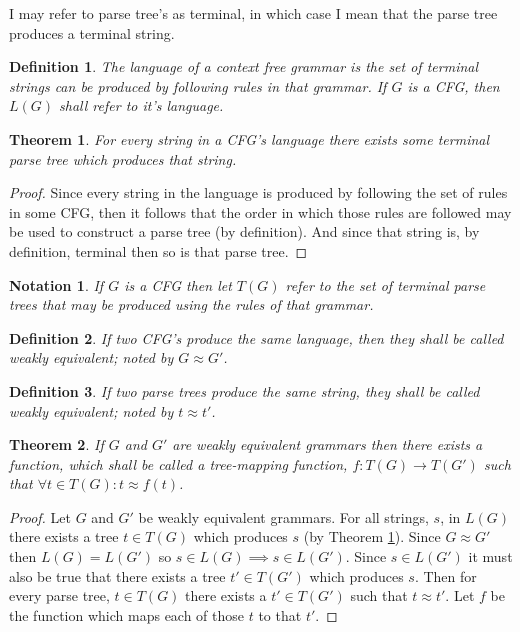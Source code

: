 \documentclass[11pt]{article}
\newtheorem{definition}{Definition}
\newtheorem{theorem}{Theorem}
\newtheorem{notation}{Notation}
\begin{document}
I may refer to parse tree's as terminal, in which case I mean that the parse tree produces
a terminal string.

\begin{definition}
The {\em language} of a context free grammar is the set of terminal strings
can be produced by following rules in that grammar. If $G$ is a CFG, then $L(G)$ shall
refer to it's language.
\end{definition}

\begin{theorem}
\label{parseable}
For every string in a CFG's language there exists some terminal parse tree which produces
that string.
\end{theorem}
\begin{proof}
Since every string in the language is produced by following the set of rules in some CFG,
then it follows that the order in which those rules are followed may be used to construct
a parse tree (by definition). And since that string is, by definition, terminal then so
is that parse tree.
\end{proof}

\begin{notation}
If $G$ is a CFG then let $T(G)$ refer to the set of terminal parse trees that may be produced
using the rules of that grammar.
\end{notation}

\begin{definition}
If two CFG's produce the same language, then they shall be called {\em weakly equivalent}; noted
by $G \approx G'$.
\end{definition}

\begin{definition}
If two parse trees produce the same string, they shall be called {\em weakly equivalent}; noted
by $t \approx t'$.
\end{definition}


\begin{theorem}
If $G$ and $G'$ are weakly equivalent grammars then there exists a function, which shall be called
a {\em tree-mapping function}, $f:T(G) \rightarrow T(G')$ such that $\forall t \in T(G): t \approx f(t)$.
\end{theorem}

\begin{proof}
Let $G$ and $G'$ be weakly equivalent grammars.
For all strings, $s$, in $L(G)$ there exists a tree $t \in T(G)$ which produces $s$ (by Theorem \ref{parseable}).
Since $G \approx G'$ then $L(G) = L(G')$ so $s \in L(G) \implies s \in L(G')$. 
Since $s \in L(G')$ it must also be true that there exists a tree $t' \in T(G')$ which produces $s$.
Then for every parse tree, $t \in T(G)$ there exists a $t' \in T(G')$ such that
$t \approx t'$. Let $f$ be the function which maps each of those $t$ to that $t'$.
\end{proof}
\end{document}
